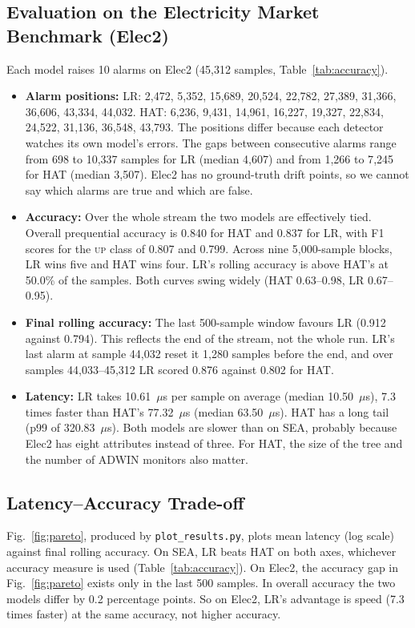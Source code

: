 \documentclass[conference]{IEEEtran}
\begin{document}
\subsection{Evaluation on the Electricity Market Benchmark (Elec2)}
Each model raises 10 alarms on Elec2 (45{,}312 samples, Table~\ref{tab:accuracy}).
\begin{itemize}
    \item \textbf{Alarm positions:} LR: 2{,}472, 5{,}352, 15{,}689, 20{,}524, 22{,}782, 27{,}389, 31{,}366, 36{,}606, 43{,}334, 44{,}032. HAT: 6{,}236, 9{,}431, 14{,}961, 16{,}227, 19{,}327, 22{,}834, 24{,}522, 31{,}136, 36{,}548, 43{,}793. The positions differ because each detector watches its own model's errors. The gaps between consecutive alarms range from 698 to 10{,}337 samples for LR (median 4{,}607) and from 1{,}266 to 7{,}245 for HAT (median 3{,}507). Elec2 has no ground-truth drift points, so we cannot say which alarms are true and which are false.
    \item \textbf{Accuracy:} Over the whole stream the two models are effectively tied. Overall prequential accuracy is 0.840 for HAT and 0.837 for LR, with F1 scores for the \textsc{up} class of 0.807 and 0.799. Across nine 5{,}000-sample blocks, LR wins five and HAT wins four. LR's rolling accuracy is above HAT's at 50.0\% of the samples. Both curves swing widely (HAT 0.63--0.98, LR 0.67--0.95).
    \item \textbf{Final rolling accuracy:} The last 500-sample window favours LR (0.912 against 0.794). This reflects the end of the stream, not the whole run. LR's last alarm at sample 44{,}032 reset it 1{,}280 samples before the end, and over samples 44{,}033--45{,}312 LR scored 0.876 against 0.802 for HAT.
    \item \textbf{Latency:} LR takes 10.61~$\mu$s per sample on average (median 10.50~$\mu$s), 7.3 times faster than HAT's 77.32~$\mu$s (median 63.50~$\mu$s). HAT has a long tail (p99 of 320.83~$\mu$s). Both models are slower than on SEA, probably because Elec2 has eight attributes instead of three. For HAT, the size of the tree and the number of ADWIN monitors also matter.
\end{itemize}

\subsection{Latency--Accuracy Trade-off}
Fig.~\ref{fig:pareto}, produced by \texttt{plot\_results.py}, plots mean latency (log scale) against final rolling accuracy.
On SEA, LR beats HAT on both axes, whichever accuracy measure is used (Table~\ref{tab:accuracy}).
On Elec2, the accuracy gap in Fig.~\ref{fig:pareto} exists only in the last 500 samples.
In overall accuracy the two models differ by 0.2 percentage points.
So on Elec2, LR's advantage is speed (7.3 times faster) at the same accuracy, not higher accuracy.
\end{document}
